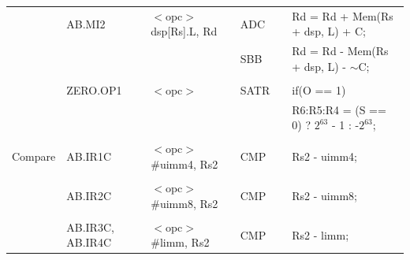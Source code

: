 \begin{table}
\begin{center}
\begin{tabular}{llllll}
                   & AB.MI2            & $<$opc$>$ dsp[Rs].L, Rd               & ADC               & \flags{****}      & Rd = Rd + Mem(Rs + dsp, L) + C;                                               \\
                   &                   &                                       & SBB               & \flags{****}      & Rd = Rd - Mem(Rs + dsp, L) - $\sim$C;                                         \\
                   &                   &                                       &                   &                   &                                                                               \\
                   & ZERO.OP1          & $<$opc$>$                             & SATR              & \flags{----}      & if(O == 1)                                                                    \\
                   &                   &                                       &                   &                   & \quad R6:R5:R4 = (S == 0) ? $2^{63}$ - 1 : -$2^{63}$;                         \\
                   &                   &                                       &                   &                   &                                                                               \\
Compare            & AB.IR1C           & $<$opc$>$ \#uimm4, Rs2                & CMP               & \flags{****}      & Rs2 - uimm4;                                                                  \\
                   &                   &                                       &                   &                   &                                                                               \\
                   & AB.IR2C           & $<$opc$>$ \#uimm8, Rs2                & CMP               & \flags{****}      & Rs2 - uimm8;                                                                  \\
                   &                   &                                       &                   &                   &                                                                               \\
                   & AB.IR3C, AB.IR4C  & $<$opc$>$ \#limm, Rs2                 & CMP               & \flags{****}      & Rs2 - limm;                                                                   \\

\end{tabular}
\end{center}
\end{table}
